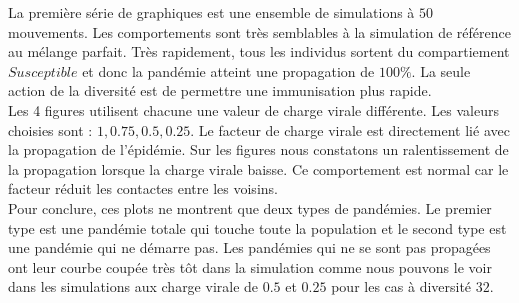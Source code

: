 La première série de graphiques est une ensemble de simulations à $50$ mouvements. Les comportements sont très semblables à la simulation de référence au mélange parfait. Très rapidement, tous les individus sortent du compartiement $Susceptible$ et donc la pandémie atteint une propagation de $100\%$. La seule action de la diversité est de permettre une immunisation plus rapide.\\

Les 4 figures utilisent chacune une valeur de charge virale différente. Les valeurs choisies sont : $1,0.75,0.5,0.25$. Le facteur de charge virale est directement lié avec la propagation de l'épidémie. Sur les figures nous constatons un ralentissement de la propagation lorsque la charge virale baisse. Ce comportement est normal car le facteur réduit les contactes entre les voisins.\\

Pour conclure, ces plots ne montrent que deux types de pandémies. Le premier type est une pandémie totale qui touche toute la population et le second type est une pandémie qui ne démarre pas. Les pandémies qui ne se sont pas propagées ont leur courbe coupée très tôt dans la simulation comme nous pouvons le voir dans les simulations aux charge virale de $0.5$ et $0.25$ pour les cas à diversité $32$.

\newpage

